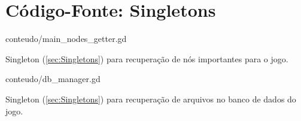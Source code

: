 
\chapter{Código-Fonte: Singletons}
\label{ap:codigo}

\begin{program}
    
    {conteudo/main_nodes_getter.gd}
    \caption{Singleton (\ref{sec:Singletons}) para recuperação de nós importantes para o jogo\label{prog:main_nodes_getter}.}
\end{program}

\begin{program}
    
    {conteudo/db_manager.gd}
    \caption{Singleton (\ref{sec:Singletons}) para recuperação de arquivos no banco de dados do jogo\label{prog:db_manager}.}
\end{program}